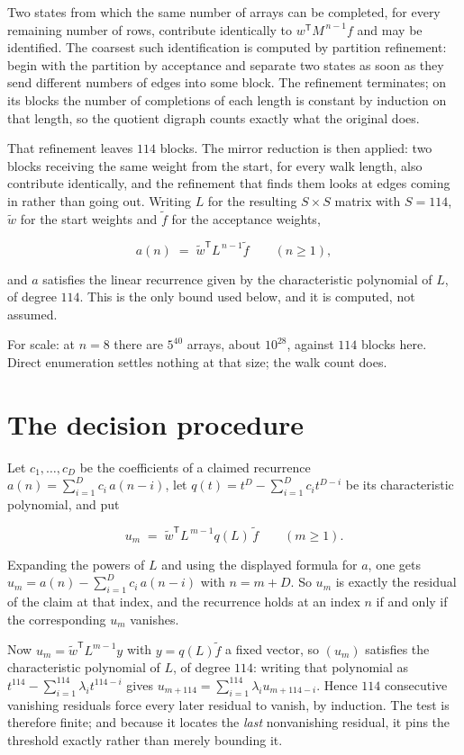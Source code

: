 \documentclass[11pt]{article}
\theoremstyle{definition}
\begin{document}
Two states from which the same number of arrays can be completed, for every remaining number of rows, contribute identically to $w^{\mathsf T}M^{\,n-1}f$ and may be identified. The coarsest such identification is computed by partition refinement: begin with the partition by acceptance and separate two states as soon as they send different numbers of edges into some block. The refinement terminates; on its blocks the number of completions of each length is constant by induction on that length, so the quotient digraph counts exactly what the original does.

That refinement leaves $114$ blocks. The mirror reduction is then applied: two blocks receiving the same weight from the start, for every walk length, also contribute identically, and the refinement that finds them looks at edges coming in rather than going out. Writing $L$ for the resulting $S \times S$ matrix with $S = 114$, $\tilde w$ for the start weights and $\tilde f$ for the acceptance weights,

\[a(n) \;=\; \tilde w^{\mathsf T} L^{\,n-1} \tilde f \qquad (n \ge 1),\]

and $a$ satisfies the linear recurrence given by the characteristic polynomial of $L$, of degree $114$. This is the only bound used below, and it is computed, not assumed.

For scale: at $n = 8$ there are $5^{40}$ arrays, about $10^{28}$, against $114$ blocks here. Direct enumeration settles nothing at that size; the walk count does.

\section{The decision procedure}

Let $c_1,\dots,c_D$ be the coefficients of a claimed recurrence $a(n) = \sum_{i=1}^{D} c_i\,a(n-i)$, let $q(t) = t^{D} - \sum_{i=1}^{D} c_i t^{D-i}$ be its characteristic polynomial, and put

\[u_m \;=\; \tilde w^{\mathsf T} L^{\,m-1} q(L)\,\tilde f \qquad (m \ge 1).\]

Expanding the powers of $L$ and using the displayed formula for $a$, one gets $u_m = a(n) - \sum_{i=1}^{D} c_i\,a(n-i)$ with $n = m + D$. So $u_m$ is exactly the residual of the claim at that index, and the recurrence holds at an index $n$ if and only if the corresponding $u_m$ vanishes.

Now $u_m = \tilde w^{\mathsf T} L^{m-1} y$ with $y = q(L)\tilde f$ a fixed vector, so $(u_m)$ satisfies the characteristic polynomial of $L$, of degree $114$: writing that polynomial as $t^{114} - \sum_{i=1}^{114} \lambda_i t^{114-i}$ gives $u_{m+114} = \sum_{i=1}^{114} \lambda_i u_{m+114-i}$. Hence $114$ consecutive vanishing residuals force every later residual to vanish, by induction. The test is therefore finite; and because it locates the {\itshape last} nonvanishing residual, it pins the threshold exactly rather than merely bounding it.
\end{document}
